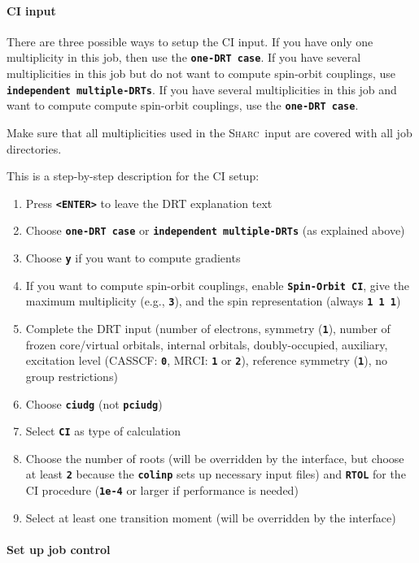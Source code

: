 \documentclass[a4paper,11pt,DIV=15,openany]{scrbook}
\newcommand{\sharc}{\textsc{Sharc}}
\newcommand{\ttt}[1]{\textbf{\texttt{#1}}}
\begin{document}
\paragraph{CI input}

There are three possible ways to setup the CI input.
If you have only one multiplicity in this job, then use the \ttt{one-DRT case}.
If you have several multiplicities in this job but do not want to compute spin-orbit couplings, use \ttt{independent multiple-DRTs}.
If you have several multiplicities in this job and want to compute compute spin-orbit couplings, use the \ttt{one-DRT case}.

Make sure that all multiplicities used in the \sharc\ input are covered with all job directories.

This is a step-by-step description for the CI setup:
\begin{enumerate}
  \item Press \ttt{<ENTER>} to leave the DRT explanation text
  \item Choose \ttt{one-DRT case} or \ttt{independent multiple-DRTs} (as explained above)
  \item Choose \ttt{y} if you want to compute gradients
  \item If you want to compute spin-orbit couplings, enable \ttt{Spin-Orbit CI}, give the maximum multiplicity (e.g., \ttt{3}), and the spin representation (always \ttt{1 1 1})
  \item Complete the DRT input (number of electrons, symmetry (\ttt{1}), number of frozen core/virtual orbitals, internal orbitals, doubly-occupied, auxiliary, excitation level (CASSCF: \ttt{0}, MRCI: \ttt{1} or \ttt{2}), reference symmetry (\ttt{1}), no group restrictions)
  \item Choose \ttt{ciudg} (not \ttt{pciudg})
  \item Select \ttt{CI} as type of calculation
  \item Choose the number of roots (will be overridden by the interface, but choose at least \ttt{2} because the \ttt{colinp} sets up necessary input files) and \ttt{RTOL} for the CI procedure (\ttt{1e-4} or larger if performance is needed)
  \item Select at least one transition moment (will be overridden by the interface)
\end{enumerate}

\paragraph{Set up job control}
\end{document}

